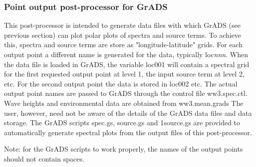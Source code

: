 \vsssub
\subsubsection{Point output post-processor for GrADS} \label{sec:gxoutp}
\vsssub



\vspace{\baselineskip} 
\noindent
This post-processor is intended to generate data files with which GrADS (see
previous section) can plot polar plots of spectra and source terms. To achieve
this, spectra and source terms are store as "longitude-latitude" grids. For
each output point a different name is generated for the data, typically {\F
loc{\it nnn}}. When the data file is loaded in GrADS, the variable {\F loc001}
will contain a spectral grid for the first requested output point at level 1,
the input source term at level 2, etc. For the second output point the data is
stored in {\F loc002} etc. The actual output point names are passed to GrADS
through the control file {\file ww3.spec.ctl}. Wave heights and environmental
data are obtained from {\file ww3.mean.grads} The user, however, need not be
aware of the details of the GrADS data files and data storage. The GrADS
scripts {\file spec.gs}, {\file source.gs} and {\file 1source.gs} are provided
to automatically generate spectral plots from the output files of this
post-processor.

Note: for the GrADS scripts to work properly, the names of the output points
should not contain spaces.

\pb